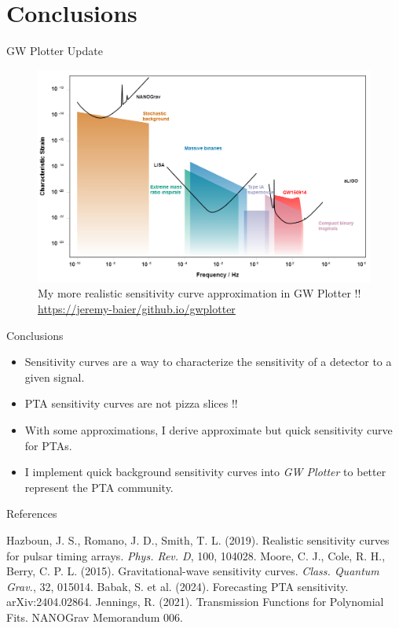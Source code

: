 \documentclass{beamer}
\begin{document}
\section{Conclusions}

\begin{frame}{GW Plotter Update}
    \begin{figure}
        \centering
        \includegraphics[width=\linewidth]{figs/my_gwplotter.png}
        \caption{My more realistic sensitivity curve approximation in GW Plotter !!
        \centering \url{https://jeremy-baier/github.io/gwplotter}
        }
        \label{fig:gwplotter_update}
    \end{figure}
\end{frame}

\begin{frame}{Conclusions}
    \begin{itemize}
        \item Sensitivity curves are a way to characterize the sensitivity of a detector to a given signal.
        \item PTA sensitivity curves are not pizza slices !!
        \item With some approximations, I derive approximate but quick sensitivity curve for PTAs.
        \item I implement quick background sensitivity curves into \textit{GW Plotter} to better represent the PTA community.
    \end{itemize}
\end{frame}

\begin{frame}{References}
    \begin{thebibliography}{1}
         Hazboun, J. S., Romano, J. D., Smith, T. L. (2019). Realistic sensitivity curves for pulsar timing arrays. \textit{Phys. Rev. D}, 100, 104028.
         Moore, C. J., Cole, R. H., Berry, C. P. L. (2015). Gravitational-wave sensitivity curves. \textit{Class. Quantum Grav.}, 32, 015014.
         Babak, S. et al. (2024). Forecasting PTA sensitivity. arXiv:2404.02864.
         Jennings, R. (2021). Transmission Functions for Polynomial Fits. NANOGrav Memorandum 006.
    \end{thebibliography}
\end{frame}
\end{document}
